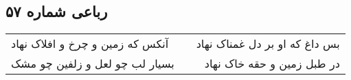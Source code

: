 \begin{center}
\section*{رباعی شماره ۵۷}
\label{sec:sh057}
\begin{longtable}{l p{0.5cm} r}
آنکس که زمین و چرخ و افلاک نهاد
&&
بس داغ که او بر دل غمناک نهاد
\\
بسیار لب چو لعل و زلفین چو مشک
&&
در طبل زمین و حقه خاک نهاد
\\
\end{longtable}
\end{center}
